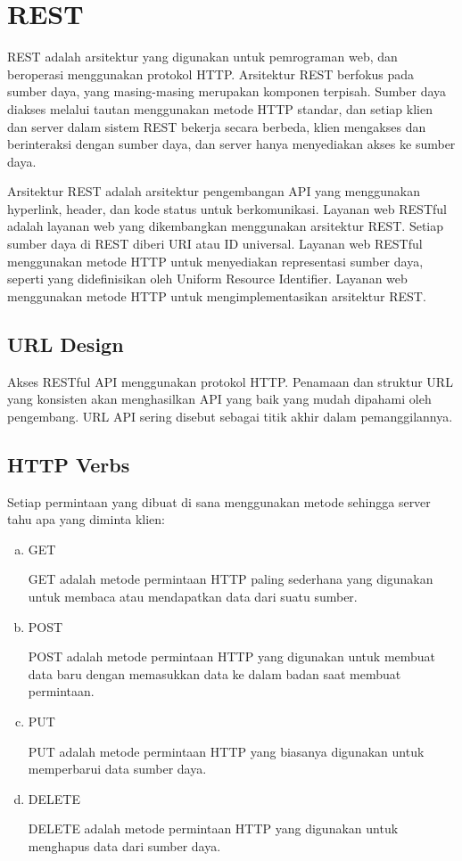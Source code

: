 \section{REST}

REST adalah arsitektur yang digunakan untuk pemrograman web, dan beroperasi menggunakan protokol HTTP. Arsitektur REST berfokus pada sumber daya, yang masing-masing merupakan komponen terpisah. Sumber daya diakses melalui tautan menggunakan metode HTTP standar, dan setiap klien dan server dalam sistem REST bekerja secara berbeda, klien mengakses dan berinteraksi dengan sumber daya, dan server hanya menyediakan akses ke sumber daya. 

Arsitektur REST adalah arsitektur pengembangan API yang menggunakan hyperlink, header, dan kode status untuk berkomunikasi. Layanan web RESTful adalah layanan web yang dikembangkan menggunakan arsitektur REST. Setiap sumber daya di REST diberi URI atau ID universal. Layanan web RESTful menggunakan metode HTTP untuk menyediakan representasi sumber daya, seperti yang didefinisikan oleh Uniform Resource Identifier. Layanan web menggunakan metode HTTP untuk mengimplementasikan arsitektur REST.

	
	\subsection {URL Design}
	
	Akses RESTful API menggunakan protokol HTTP. Penamaan dan struktur URL yang konsisten akan menghasilkan API yang baik yang mudah dipahami oleh pengembang. URL API sering disebut sebagai titik akhir dalam pemanggilannya.
	
	\subsection {HTTP Verbs}
	
	Setiap permintaan yang dibuat di sana menggunakan metode sehingga server tahu apa yang diminta klien:
	
	\begin{enumerate}[a.]
		
		\item GET
		
		GET adalah metode permintaan HTTP paling sederhana yang digunakan untuk membaca atau mendapatkan data dari suatu sumber.
		
		\item POST
		
		POST adalah metode permintaan HTTP yang digunakan untuk membuat data baru dengan memasukkan data ke dalam badan saat membuat permintaan.
		
		\item PUT
		
		PUT adalah metode permintaan HTTP yang biasanya digunakan untuk memperbarui data sumber daya.
		
		\item DELETE
		
		DELETE adalah metode permintaan HTTP yang digunakan untuk menghapus data dari sumber daya.

	\end{enumerate}
	
